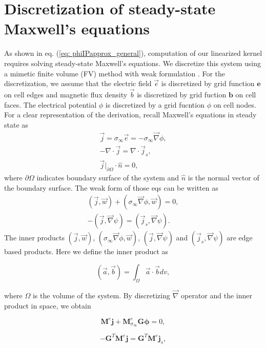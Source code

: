 \documentclass[extra,mreferee]{gji}
\renewcommand{\div}{\nabla\cdot}
\newcommand{\grad}{\vec \nabla}
\newcommand{\siginf}{\sigma_\infty}
\newcommand{\dgrad}{{\mathbf G}}
\newcommand{\M}{{\mathbf M}}
\newcommand{\MeSigInf}{{\M^e_{\sigma_\infty}}}
\newcommand{\Me}{{\M^e}}
\renewcommand {\j}  { {\vec j} }
\renewcommand {\b}  { {\vec b} }
\newcommand {\e}  { {\vec e} }
\renewcommand {\dj}  { {\mathbf{j} } }
\newcommand {\db}  { {\mathbf{b} } }
\newcommand {\de}  { {\mathbf{e} } }
\begin{document}
\section{Discretization of steady-state Maxwell's equations}
\label{section:maxwell_discrete}
As shown in eq. (\ref{eq: phiIPapprox_general}), computation of our linearized kernel requires solving steady-state Maxwell's equations. 
We discretize this system using a mimetic finite volume (FV) method with weak formulation \cite[]{Yee1966,Eldadbook}. 
For the discretization, we assume that the electric field $\e$ is discretized by grid function $\de$ on cell edges and magnetic flux density $\b$ is discretized by grid fuction $\db$ on cell faces. 
The electrical potential $\phi$ is discretized by a grid fucntion  $\phi$ on cell nodes. For a clear representation of the derivation, recall Maxwell's equations in steady state as
\begin{align}
  \j = \siginf\e = -\siginf\grad \phi, \\
  -\div \j = \div \j_s, \\
  \j\big|_{\partial \Omega}\cdot\hat{n} = 0,
  \label{eq:DCBCneumann}
\end{align}
where $\partial \Omega$ indicates boundary surface of the system and $\hat{n}$ is the normal vector of the boundary surface. The weak form of those eqs can be written as
\begin{align}
  (\j, \vec{w}) + (\siginf \grad \phi, \vec{w}) = 0, \\
  -(\j, \grad \psi) = (\j_s, \grad \psi).
\end{align}
The inner products $(\j, \vec{w})$, $(\siginf \grad \phi, \vec{w})$,  $(\j, \grad \psi)$ and $(\j_s, \grad \psi)$ are edge based products. Here we define the inner product as
\begin{linenomath*}
\begin{equation}
  (\vec{a}, \vec{b}) = \int_{\Omega} \vec{a}\cdot\vec{b} dv,
\end{equation}
\end{linenomath*}
where $\Omega$ is the volume of the system. By discretizing $\grad$ operator and the inner product in space, we obtain
\begin{linenomath*}
\begin{equation}
  \Me\dj + \MeSigInf\dgrad\boldsymbol{\phi} = 0,
  \label{eq:DCdisceq1}
\end{equation}
\end{linenomath*}
\begin{linenomath*}
\begin{equation}
  -\dgrad^T \Me\dj = \dgrad^T \Me\dj_s,
  \label{eq:DCdisceq2}
\end{equation}
\end{linenomath*}
\end{document}

